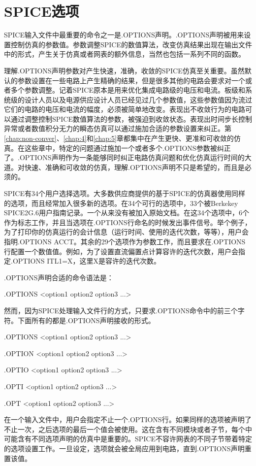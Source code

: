\chapter{SPICE选项}
SPICE输入文件中最重要的命令之一是.OPTIONS声明。.OPTIONS声明被用来设置控制仿真的参数值。参数调整SPICE的数值算法，改变仿真结果出现在输出文件中的形式，产生关于仿真或者网表的额外信息，当然也包括一系列不同的函数。

理解.OPTIONS声明参数对产生快速，准确，收敛的SPICE仿真至关重要。虽然默认的参数设置在一些电路上产生精确的结果，但是很多其他的电路会要求对一个或者多个参数调整。记着SPICE原本是用来优化集成电路级的电压和电流。板级和系统级的设计人员以及电源供应设计人员已经见过几个参数值，这些参数值因为流过它们的电路的电压和电流的幅度，必须被简单地改变。表现出不收敛行为的电路可以通过调整控制SPICE数值算法的参数，被强迫到收敛状态。表现出时间步长控制异常或者数值积分无力的瞬态仿真可以通过施加合适的参数设置来纠正。第\ref{chap:non-conver}、\ref{chap:4}和\ref{chap:5}章都集中在产生更快、更准和可收敛的仿真。在这些章中，特定的问题通过施加一个或者多个.OPTIONS参数被纠正了。.OPTIONS声明作为一条能够同时纠正电路仿真问题和优化仿真运行时间的大道。对快速、准确和可收敛的仿真，理解.OPTIONS声明不只是希望的，而且是必须的。

SPICE有34个用户选择选项。大多数供应商提供的基于SPICE的仿真器使用同样的选项，而且经常加入很多新的选项。在34个可行的选项中，33个被Berkekey SPICE2G.6用户指南记录\cite{chap6-1}。一个从来没有被加入原始文档。在这34个选项中，6个作为标志工作，并且当选项在.OPTIONS行命名的时候发出事件信号。举个例子，为了打印你的仿真运行的会计信息（运行时间、使用的迭代次数，等等），用户会指明.OPTIONS ACCT。其余的29个选项作为参数工作，而且要求在.OPTIONS行配置一个数值值。例如，为了设置直流偏置点计算容许的迭代次数，用户会指定.OPTIONS ITL1=X，这里X是容许的迭代次数。

.OPTIONS声明合适的命令语法是：

.OPTIONS <option1 option2 option3 ...>

然而，因为SPICE处理输入文件行的方式，只要求.OPTIONS命令中的前三个字符。下面所有的都是.OPTIONS声明接收的形式。

.OPTIONS <option1 option2 option3 ...>

.OPTION <option1 option2 option3 ...>

.OPTIO <option1 option2 option3 ...>

.OPTI <option1 option2 option3 ...>

.OPT <option1 option2 option3 ...>

在一个输入文件中，用户会指定不止一个.OPTIONS行。如果同样的选项被声明了不止一次，之后选项的最后一个值会被使用。这在含有不同模块或者子节，每个中可能含有不同选项声明的仿真中是重要的。SPICE不容许网表的不同子节带着特定的选项设置工作。一旦设定，选项就会被全局应用到电路，直到.OPTIONS声明重置该值。

